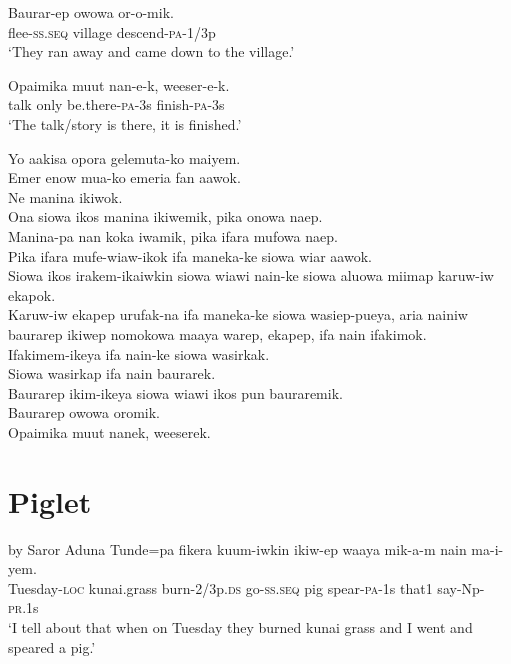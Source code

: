 \ea\label{ex:a:x12}
\gll  Baurar-ep  owowa  or-o-mik. \\
flee-\textsc{ss.seq}  village  descend-\textsc{pa}-1/3p \\
\glt ‘They ran away and came down to the village.’ \\
\z


\ea\label{ex:a:x13}
\gll  Opaimika  muut  nan-e-k,  weeser-e-k. \\
talk  only  be.there-\textsc{pa}-3s  finish-\textsc{pa}-3s \\
\glt ‘The talk/story is there, it is finished.’ \\
\z


Yo aakisa opora gelemuta-ko maiyem. \\
Emer enow mua-ko emeria fan aawok. \\
Ne manina ikiwok. \\
Ona siowa ikos manina ikiwemik, pika onowa naep. \\
Manina-pa nan koka iwamik, pika ifara mufowa naep. \\
Pika ifara mufe-wiaw-ikok ifa maneka-ke siowa wiar aawok. \\
Siowa ikos irakem-ikaiwkin siowa wiawi nain-ke siowa aluowa miimap karuw-iw ekapok. \\
Karuw-iw ekapep urufak-na ifa maneka-ke siowa wasiep-pueya,  aria nainiw baurarep ikiwep nomokowa maaya warep, ekapep, ifa nain ifakimok. \\
Ifakimem-ikeya ifa nain-ke siowa wasirkak. \\
Siowa wasirkap ifa nain baurarek. \\
Baurarep ikim-ikeya siowa wiawi ikos pun bauraremik. \\
Baurarep owowa oromik. \\
Opaimika muut nanek, weeserek. \\

\setcounter{equation}{0}
\section{ Piglet} 

 by Saror Aduna
\ea\label{ex:a:x1}
\gll  Tunde=pa  fikera  kuum-iwkin  ikiw-ep  waaya      mik-a-m  nain  ma-i-yem. \\
Tuesday-\textsc{loc}  kunai.grass  burn-2/3p.\textsc{ds}  go-\textsc{ss.seq}  pig  spear-\textsc{pa}-1s  that1  say-Np-\textsc{pr}.1s \\


\glt ‘I tell about that when on Tuesday they burned kunai grass and I went and speared a pig.’ \\
\z


